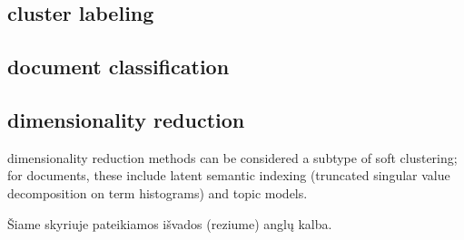 \documentclass{VUMIFInfBakalaurinis}
\begin{document}
	\subsection{cluster labeling}
	\subsection{document classification}
	\subsection{dimensionality reduction}
	dimensionality reduction methods can be considered a subtype of soft clustering; for documents, these include latent semantic indexing (truncated singular value decomposition on term histograms) and topic models.

  Šiame skyriuje pateikiamos išvados (reziume) anglų kalba.
  

\printbibliography[heading=bibintoc] %

\appendix  %
\end{document}
